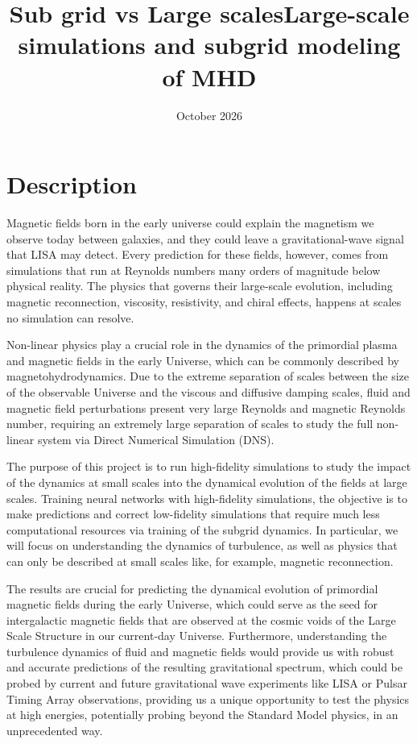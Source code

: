 \documentclass{article}
\title{Sub grid vs Large scales}
\title{Large-scale simulations and subgrid modeling of MHD}
\date{October 2026}
\begin{document}
\maketitle

\section{Description}
Magnetic fields born in the early universe could explain the magnetism we observe today between galaxies, and they could leave a gravitational-wave signal that LISA may detect. Every prediction for these fields, however, comes from simulations that run at Reynolds numbers many orders of magnitude below physical reality. The physics that governs their large-scale evolution, including magnetic reconnection, viscosity, resistivity, and chiral effects, happens at scales no simulation can resolve.

Non-linear physics play a crucial role in the dynamics of the primordial
plasma and magnetic fields in the early Universe, which can be commonly described
by magnetohydrodynamics.
Due to the extreme separation of scales between the size of the observable Universe and
the viscous and diffusive damping scales, fluid and magnetic field perturbations
present very large Reynolds and magnetic Reynolds number, requiring an extremely large
separation of scales to study the full non-linear system via Direct Numerical
Simulation (DNS).

The purpose of this project is to run high-fidelity simulations to study the 
impact of the dynamics at small scales into the dynamical evolution of the fields
at large scales.
Training neural networks with high-fidelity simulations, the objective is to make 
predictions and correct low-fidelity simulations that require much less computational
resources via training of the subgrid dynamics.
In particular, we will focus on understanding the dynamics of turbulence, as well
as physics that can only be described at small scales like, for example, magnetic reconnection.

The results are crucial for predicting the dynamical evolution of primordial magnetic
fields during the early Universe, which could serve as the seed for intergalactic
magnetic fields that are observed at the cosmic voids of the Large Scale Structure
in our current-day Universe.
Furthermore, understanding the turbulence dynamics of fluid and magnetic fields would
provide us with robust and accurate predictions of the resulting gravitational spectrum,
which could be probed by current and future gravitational wave experiments
like LISA or Pulsar Timing Array observations, providing us a unique opportunity to test
the physics at high energies, potentially probing beyond the Standard Model physics,
in an unprecedented way.
\end{document}
